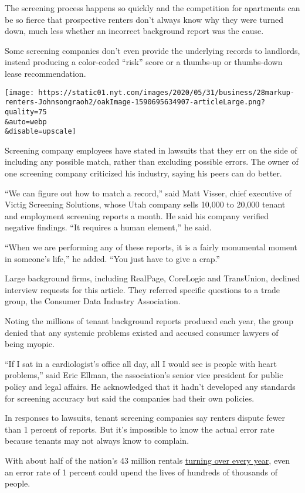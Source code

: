 The screening process happens so quickly and the competition for
apartments can be so fierce that prospective renters don't always know
why they were turned down, much less whether an incorrect background
report was the cause.

Some screening companies don't even provide the underlying records to
landlords, instead producing a color-coded ``risk'' score or a thumbs-up
or thumbs-down lease recommendation.

\texttt{[image: https://static01.nyt.com/images/2020/05/31/business/28markup-renters-Johnsongraoh2/oakImage-1590695634907-articleLarge.png?quality=75\\\&auto=webp\\\&disable=upscale]}

Screening company employees have stated in lawsuits that they err on the
side of including any possible match, rather than excluding possible
errors. The owner of one screening company criticized his industry,
saying his peers can do better.

``We can figure out how to match a record,'' said Matt Visser, chief
executive of Victig Screening Solutions, whose Utah company sells 10,000
to 20,000 tenant and employment screening reports a month. He said his
company verified negative findings. ``It requires a human element,'' he
said.

``When we are performing any of these reports, it is a fairly monumental
moment in someone's life,'' he added. ``You just have to give a crap.''

Large background firms, including RealPage, CoreLogic and TransUnion,
declined interview requests for this article. They referred specific
questions to a trade group, the Consumer Data Industry Association.

Noting the millions of tenant background reports produced each year, the
group denied that any systemic problems existed and accused consumer
lawyers of being myopic.

``If I sat in a cardiologist's office all day, all I would see is people
with heart problems,'' said Eric Ellman, the association's senior vice
president for public policy and legal affairs. He acknowledged that it
hadn't developed any standards for screening accuracy but said the
companies had their own policies.

In responses to lawsuits, tenant screening companies say renters dispute
fewer than 1 percent of reports. But it's impossible to know the actual
error rate because tenants may not always know to complain.

With about half of the nation's 43 million rentals
\href{https://www.cbre.us/research-and-reports/US-Multifamily-Research-Brief---Apartment-Turnover-Rate-Continues-to-Fall-July-2019}{turning
over every year}, even an error rate of 1 percent could upend the lives
of hundreds of thousands of people.

